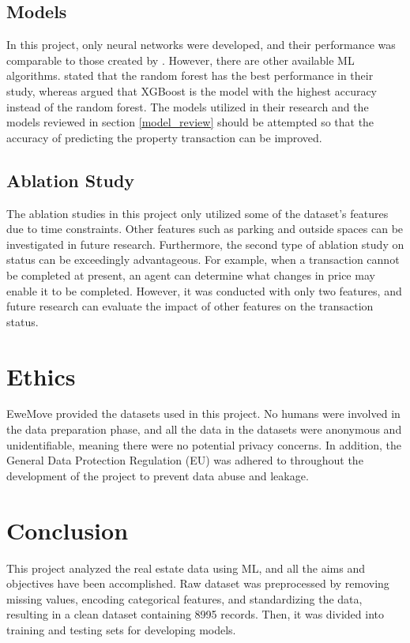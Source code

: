 \documentclass[12pt,twoside]{report}
\begin{document}
\subsection{Models}
In this project, only neural networks were developed, and their performance was comparable to those created by \citet{RN37}. However, there are other available ML algorithms. \citet{RN17} stated that the random forest has the best performance in their study, whereas \citet{RN20} argued that XGBoost is the model with the highest accuracy instead of the random forest. The models utilized in their research and the models reviewed in section \ref{model_review} should be attempted so that the accuracy of predicting the property transaction can be improved. 

\subsection{Ablation Study}
The ablation studies in this project only utilized some of the dataset's features due to time constraints. Other features such as parking and outside spaces can be investigated in future research. Furthermore, the second type of ablation study on status can be exceedingly advantageous. For example, when a transaction cannot be completed at present, an agent can determine what changes in price may enable it to be completed. However, it was conducted with only two features, and future research can evaluate the impact of other features on the transaction status. 

\section{Ethics}
EweMove provided the datasets used in this project. No humans were involved in the data preparation phase, and all the data in the datasets were anonymous and unidentifiable, meaning there were no potential privacy concerns. In addition, the General Data Protection Regulation (EU) was adhered to throughout the development of the project to prevent data abuse and leakage. 
\clearpage

\section{Conclusion}
This project analyzed the real estate data using ML, and all the aims and objectives have been accomplished. Raw dataset was preprocessed by removing missing values, encoding categorical features, and standardizing the data, resulting in a clean dataset containing 8995 records. Then, it was divided into training and testing sets for developing models. 
\\
\end{document}
